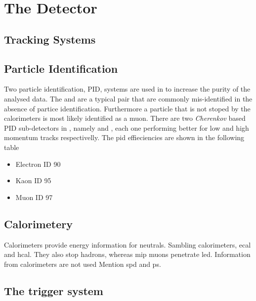 
\chapter{The \lhcb Detector}
\label{lhcb_detector}



\section{Tracking Systems}
\label{det_tracking}



\section{Particle Identification}
\label{det_pid}
Two particle identification, PID, systems are used in \lhcb to increase the purity of the analysed data.
The \kaon and \pion are a typical pair that are commonly mis-identified in the absence of partice
identification. Furthermore a particle that is not stoped by the calorimeters is most likely identified
as a muon. There are two {\it Cherenkov} based PID sub-detectors in \lhcb, namely \richone and \richtwo,
each one performing better for low and high momentum tracks respectivelly. The pid effieciencies are shown
in the following table

\begin{itemize}
  \item Electron ID  90 %
  \item Kaon ID 95 %
  \item Muon ID 97 %
\end{itemize}

\section{Calorimetery}
\label{det_calo}
Calorimeters provide energy information for neutrals.
Sambling calorimeters, ecal and hcal.
They also stop hadrons, whereas mip muons penetrate led.
Information from calorimeters are not used
Mention spd and ps.

\section{The trigger system}
\label{det_trigger}

